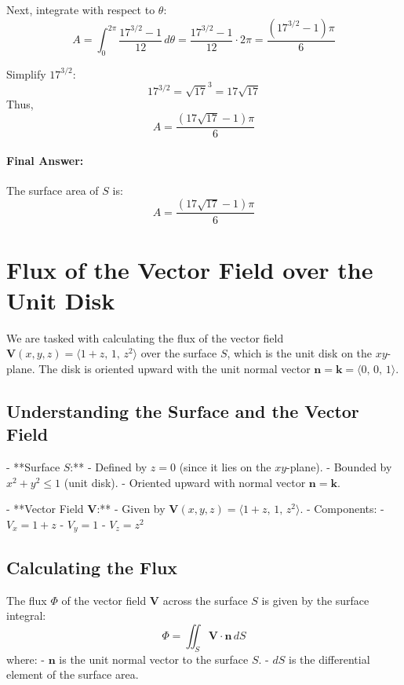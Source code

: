 \documentclass[11pt]{article}
\begin{document}
Next, integrate with respect to \( \theta \):
\[
A = \int_{0}^{2\pi} \frac{17^{3/2} - 1}{12} \, d\theta = \frac{17^{3/2} - 1}{12} \cdot 2\pi = \frac{(17^{3/2} - 1)\pi}{6}
\]

Simplify \( 17^{3/2} \):
\[
17^{3/2} = \sqrt{17}^3 = 17 \sqrt{17}
\]
Thus,
\[
A = \frac{(17 \sqrt{17} - 1)\pi}{6}
\]

\paragraph{Final Answer:}

The surface area of \( S \) is:
\[
\boxed{ A = \frac{(17 \sqrt{17} - 1)\pi}{6} }
\]

\newpage

\section{Flux of the Vector Field over the Unit Disk}

We are tasked with calculating the flux of the vector field \( \mathbf{V}(x, y, z) = \langle 1 + z, \, 1, \, z^2 \rangle \) over the surface \( S \), which is the unit disk on the \( xy \)-plane. The disk is oriented upward with the unit normal vector \( \mathbf{n} = \mathbf{k} = \langle 0, \, 0, \, 1 \rangle \).

\newpage

\subsection{Understanding the Surface and the Vector Field}

- **Surface \( S \):**
  - Defined by \( z = 0 \) (since it lies on the \( xy \)-plane).
  - Bounded by \( x^2 + y^2 \leq 1 \) (unit disk).
  - Oriented upward with normal vector \( \mathbf{n} = \mathbf{k} \).

- **Vector Field \( \mathbf{V} \):**
  - Given by \( \mathbf{V}(x, y, z) = \langle 1 + z, \, 1, \, z^2 \rangle \).
  - Components:
    - \( V_x = 1 + z \)
    - \( V_y = 1 \)
    - \( V_z = z^2 \)

\newpage

\subsection{Calculating the Flux}

The flux \( \Phi \) of the vector field \( \mathbf{V} \) across the surface \( S \) is given by the surface integral:
\[
\Phi = \iint_{S} \mathbf{V} \cdot \mathbf{n} \, dS
\]
where:
- \( \mathbf{n} \) is the unit normal vector to the surface \( S \).
- \( dS \) is the differential element of the surface area.
\end{document}
